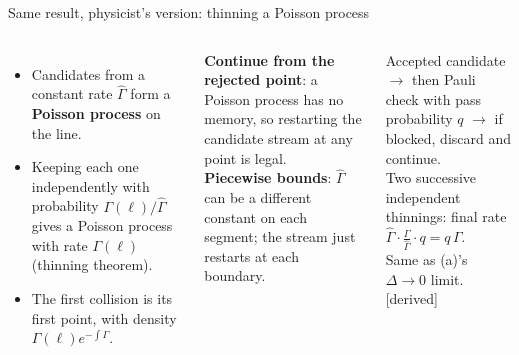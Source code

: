 \documentclass[10pt,aspectratio=169]{beamer}
\newcommand{\G}{\Gamma}
\newcommand{\Gh}{\hat\Gamma}
\newcommand{\tagder}{{\scriptsize\color{black!60}[derived]}}
\begin{document}
\begin{frame}{Same result, physicist's version: thinning a Poisson process}
\small
\begin{columns}[T]
\begin{itemize}
\item Candidates from a constant rate $\Gh$ form a \textbf{Poisson process} on the line.
\item Keeping each one independently with probability $\G(\ell)/\Gh$ gives a Poisson process with rate $\G(\ell)$ (thinning theorem).
\item The first collision is its first point, with density $\G(\ell)e^{-\int\G}$.
\end{itemize}
\begin{keybox}
\textbf{Continue from the rejected point}: a Poisson process has no memory, so restarting the candidate stream at any point is legal.\\[2pt]
\textbf{Piecewise bounds}: $\Gh$ can be a different constant on each segment; the stream just restarts at each boundary.
\end{keybox}
\begin{derivbox}
Accepted candidate $\to$ then Pauli check with pass probability $q$ $\to$ if blocked, discard and continue.\\
Two successive independent thinnings: final rate $\Gh\cdot\frac{\G}{\Gh}\cdot q=q\,\G$.\\
Same as (a)'s $\Delta\to0$ limit. \tagder
\end{derivbox}
\end{columns}
\end{frame}
\end{document}
